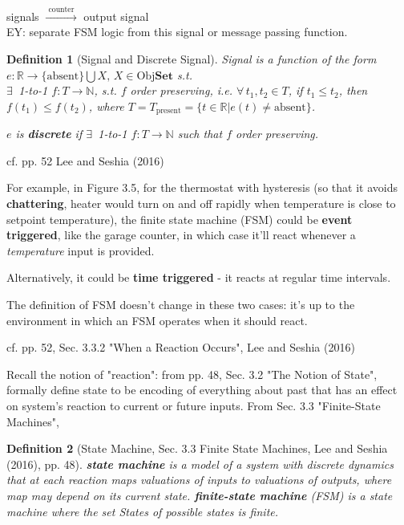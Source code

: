 \documentclass[10pt]{amsart}
\newtheorem{definition}{Definition}
\begin{document}
	signals $\xrightarrow{ \text{ counter } }$ output signal \\
	
	EY: separate FSM logic from this signal or message passing function.


\begin{definition}[Signal and Discrete Signal]
	Signal is a function of the form $e : \mathbb{R} \to \lbrace \text{absent} \rbrace \bigcup X, \, X \in \text{Obj}{\mathbf{Set}}$ s.t. \\
	$\exists \,$ 1-to-1 $f: T \to \mathbb{N}$, s.t. $f$ order preserving, i.e. $\forall \, t_1, t_2 \in T$, if $t_1 \leq t_2$, then $f(t_1) \leq f(t_2)$, where $T = T_{\text{present}} = \lbrace t \in \mathbb{R} | e(t) \neq \text{absent} \rbrace$.

	$e$ is \textbf{discrete} if $\exists \,$ 1-to-1 $f:T\to \mathbb{N}$ such that $f$ order preserving.

\end{definition} 

cf. pp. 52 Lee and Seshia (2016) \cite{LeSe2016}

For example, in Figure 3.5, for the thermostat with hysteresis (so that it avoids \textbf{chattering}, heater would turn on and off rapidly when temperature is close to setpoint temperature), the finite state machine (FSM) could be \textbf{event triggered}, like the garage counter, in which case it'll react whenever a \emph{temperature} input is provided.

Alternatively, it could be \textbf{time triggered} - it reacts at regular time intervals.

The definition of FSM doesn't change in these two cases: it's up to the environment in which an FSM operates when it should react.

cf. pp. 52, Sec. 3.3.2 "When a Reaction Occurs", Lee and Seshia (2016) \cite{LeSe2016}

Recall the notion of "reaction": from pp. 48, Sec. 3.2 "The Notion of State", formally define state to be encoding of everything about past that has an effect on system's reaction to current or future inputs. From Sec. 3.3 "Finite-State Machines", 
\begin{definition}[State Machine, Sec. 3.3 Finite State Machines, Lee and Seshia (2016)\cite{LeSe2016}, pp. 48]
	\textbf{state machine} is a model of a system with discrete dynamics that at each \emph{reaction} maps valuations of inputs to valuations of outputs, where map may depend on its current state.
	\textbf{finite-state machine} (FSM) is a state machine where the set \emph{States} of possible states is finite.
\end{definition}
\end{document}
